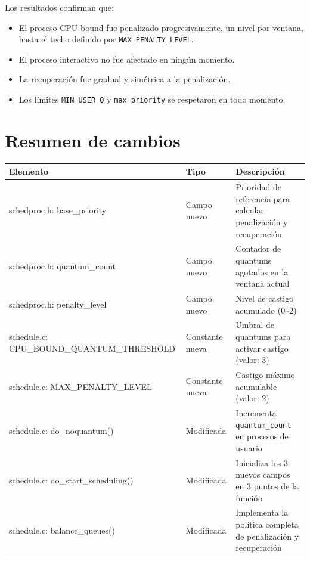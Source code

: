 \documentclass[11pt,a4paper]{article}
\begin{document}
Los resultados confirman que:
\begin{itemize}[leftmargin=*]
  \item El proceso CPU-bound fue penalizado progresivamente, un nivel por ventana,
        hasta el techo definido por \texttt{MAX\_PENALTY\_LEVEL}.
  \item El proceso interactivo no fue afectado en ning\'un momento.
  \item La recuperaci\'on fue gradual y sim\'etrica a la penalizaci\'on.
  \item Los l\'imites \texttt{MIN\_USER\_Q} y \texttt{max\_priority} se respetaron
        en todo momento.
\end{itemize}

\section{Resumen de cambios}

\begin{longtable}{>{\small\ttfamily\raggedright\arraybackslash}p{5.8cm}
                  >{\raggedright\arraybackslash}p{2.3cm}
                  >{\raggedright\arraybackslash}p{5.4cm}}
\toprule
\normalfont\textbf{Elemento} & \textbf{Tipo} & \textbf{Descripci\'on} \\
\midrule
\endhead
schedproc.h: base\_priority &
  Campo nuevo &
  Prioridad de referencia para calcular penalizaci\'on y recuperaci\'on \\[4pt]
schedproc.h: quantum\_count &
  Campo nuevo &
  Contador de quantums agotados en la ventana actual \\[4pt]
schedproc.h: penalty\_level &
  Campo nuevo &
  Nivel de castigo acumulado (0--2) \\[4pt]
schedule.c: CPU\_BOUND\_QUANTUM\_THRESHOLD &
  Constante nueva &
  Umbral de quantums para activar castigo (valor: 3) \\[4pt]
schedule.c: MAX\_PENALTY\_LEVEL &
  Constante nueva &
  Castigo m\'aximo acumulable (valor: 2) \\[4pt]
schedule.c: do\_noquantum() &
  Modificada &
  Incrementa \texttt{quantum\_count} en procesos de usuario \\[4pt]
schedule.c: do\_start\_scheduling() &
  Modificada &
  Inicializa los 3 nuevos campos en 3 puntos de la funci\'on \\[4pt]
schedule.c: balance\_queues() &
  Modificada &
  Implementa la pol\'itica completa de penalizaci\'on y recuperaci\'on \\
\bottomrule
\end{longtable}
\end{document}
